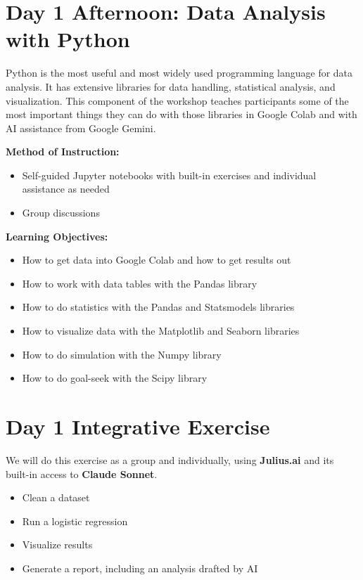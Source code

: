 \documentclass[11pt]{scrartcl}
\begin{document}
\section*{Day 1 Afternoon: Data Analysis with Python}

Python is the most useful and most widely used programming language for data analysis. It has extensive libraries for data handling, statistical analysis, and visualization. This component of the workshop teaches participants some of the most important things they can do with those libraries in Google Colab and with AI assistance from Google Gemini.

\vspace{\baselineskip}
\noindent\textbf{Method of Instruction:}

\begin{itemize}
\item Self-guided Jupyter notebooks with built-in exercises and individual assistance as needed
\item Group discussions
\end{itemize}

\noindent\textbf{Learning Objectives:}

\begin{itemize}
\item How to get data into Google Colab and how to get results out
\item How to work with data tables with the Pandas library
\item How to do statistics with the Pandas and Statsmodels libraries
\item How to visualize data with the Matplotlib and Seaborn libraries
\item How to do simulation with the Numpy library
\item How to do goal-seek with the Scipy library
\end{itemize}

\section*{Day 1 Integrative Exercise}

We will do this exercise as a group and individually, using \textbf{Julius.ai} and its built-in access to \textbf{Claude Sonnet}.

\begin{itemize}
\item Clean a dataset
\item Run a logistic regression
\item Visualize results
\item Generate a report, including an analysis drafted by AI
\end{itemize}
\end{document}
